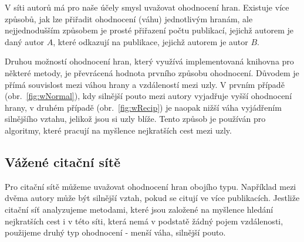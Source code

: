 \documentclass{bakalarka}
\begin{document}
V síti autorů má pro naše účely smysl uvažovat ohodnocení hran. Existuje více
způsobů, jak lze přiřadit ohodnocení (váhu) jednotlivým hranám, ale
nejjednodušším způsobem je prosté přiřazení počtu publikací, jejichž autorem je
daný autor $A$, které odkazují na publikace, jejichž autorem je autor $B$.

Druhou možností ohodnocení hran, který využívá implementovaná knihovna pro
některé metody, je převrácená hodnota prvního způsobu ohodnocení. Důvodem je
přímá souvislost mezi váhou hrany a vzdáleností mezi uzly. V prvním případě
(obr.~\ref{fig:wNormal}), kdy silnější pouto mezi autory vyjadřuje vyšší
ohodnocení hrany, v druhém případě (obr.~\ref{fig:wRecip}) je naopak nižší váha
vyjádřením silnějšího vztahu, jelikož jsou si uzly blíže.  Tento způsob je
používán pro algoritmy, které pracují na myšlence nejkratších cest mezi uzly. 

\subsection{Vážené citační sítě}
Pro citační sítě můžeme uvažovat ohodnocení hran obojího typu. Například mezi
dvěma autory může být silnější vztah, pokud se citují ve více publikacích.
Jestliže citační síť analyzujeme metodami, které jsou založené na myšlence
hledání nejkratších cest i v této síti, která nemá v podstatě žádný pojem
vzdálenosti, použijeme druhý typ ohodnocení - menší váha, silnější pouto.
\end{document}
